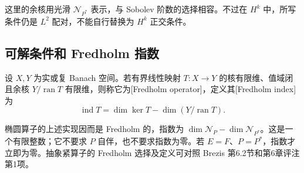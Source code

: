 这里的余核用光滑 \(\mathcal N_{P^*}\) 表示，与 Sobolev 阶数的选择相容。不过在 \(H^k\) 中，所写条件仍是 \(L^2\) 配对，不能自行替换为 \(H^k\) 正交条件。

\subsection{可解条件和 Fredholm 指数}
\label{g3:subsec:1302:04}
\begin{definition}\label{g3:def:fredholm-operator}
	设 \(X,Y\) 为实或复 Banach 空间。若有界线性映射 \(T:X\to Y\) 的核有限维、值域闭且余核 \(Y/\operatorname{ran}T\) 有限维，则称它为[Fredholm operator]，定义其[Fredholm index]为
	\[
		\operatorname{ind}T=\dim\ker T-\dim(Y/\operatorname{ran}T).
	\]
\end{definition}

椭圆算子的上述实现因而是 Fredholm 的，指数为
\(\dim\mathcal N_P-\dim\mathcal N_{P^*}\)。这是一个有限整数；它不要求 \(P\) 自伴，也不要求指数为零。若 \(E=F\)、\(P=P^*\)，指数才立即为零。抽象紧算子的 Fredholm 选择及定义可对照 Brezis 第6.2节和第6章评注第1项\cite[第6.2节，第6章评注第1项]{Brezis2011}。

